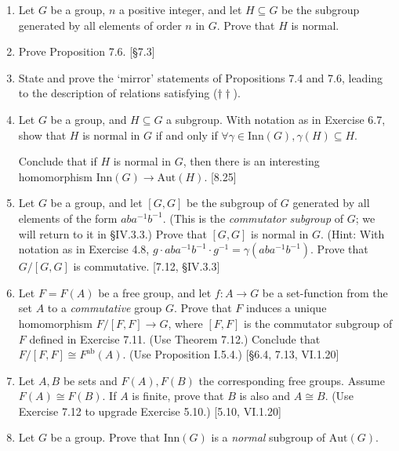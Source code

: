 \begin{enumerate}
    \item Let $G$ be a group, $n$ a positive integer, and let $H \subseteq G$ be the subgroup generated by all elements of order $n$ in $G$. Prove that $H$ is normal.

    \item Prove Proposition 7.6. [\S7.3]

    \item State and prove the `mirror' statements of Propositions 7.4 and 7.6, leading to the description of relations satisfying ($\dagger\dagger$).

    \item Let $G$ be a group, and $H \subseteq G$ a subgroup. With notation as in Exercise 6.7, show that $H$ is normal in $G$ if and only if $\forall \gamma \in \text{Inn}(G), \gamma(H) \subseteq H$.

          Conclude that if $H$ is normal in $G$, then there is an interesting homomorphism $\text{Inn}(G) \to \text{Aut}(H)$. [8.25]

    \item Let $G$ be a group, and let $[G,G]$ be the subgroup of $G$ generated by all elements of the form $aba^{-1}b^{-1}$. (This is the \textit{commutator subgroup} of $G$; we will return to it in \S IV.3.3.) Prove that $[G,G]$ is normal in $G$. (Hint: With notation as in Exercise 4.8, $g \cdot aba^{-1}b^{-1} \cdot g^{-1} = \gamma(aba^{-1}b^{-1})$. Prove that $G/[G,G]$ is commutative. [7.12, \S IV.3.3]

    \item Let $F = F(A)$ be a free group, and let $f: A \to G$ be a set-function from the set $A$ to a \emph{commutative} group $G$. Prove that $F$ induces a unique homomorphism $F/[F,F] \to G$, where $[F,F]$ is the commutator subgroup of $F$ defined in Exercise 7.11. (Use Theorem 7.12.) Conclude that $F/[F,F] \cong F^{\text{ab}}(A)$. (Use Proposition I.5.4.) [\S6.4, 7.13, VI.1.20]

    \item Let $A, B$ be sets and $F(A), F(B)$ the corresponding free groups. Assume $F(A) \cong F(B)$. If $A$ is finite, prove that $B$ is also and $A \cong B$. (Use Exercise 7.12 to upgrade Exercise 5.10.) [5.10, VI.1.20]

    \item Let $G$ be a group. Prove that $\text{Inn}(G)$ is a \emph{normal} subgroup of $\text{Aut}(G)$.
\end{enumerate}